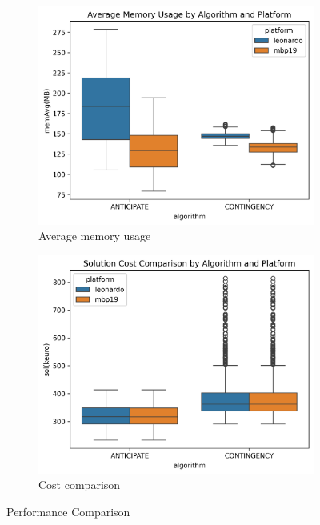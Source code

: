 \documentclass[a4paper,singleside,12pt]{report} %
\begin{document}
\begin{figure}[h!]
    \centering
    \begin{subfigure}[b]{0.4\linewidth}
        \includegraphics[width=\linewidth]{imgs/avg_mem_usage.png}
        \caption{Average memory usage}
        \label{fig:mem_usage_comparison}
    \end{subfigure}
    \begin{subfigure}[b]{0.4\linewidth}
        \includegraphics[width=\linewidth]{imgs/cost_comparison.png}
        \caption{Cost comparison}
        \label{fig:cost_comparison}
    \end{subfigure}
    \caption{Performance Comparison}
    \label{fig:comparison}
\end{figure}
\end{document}
